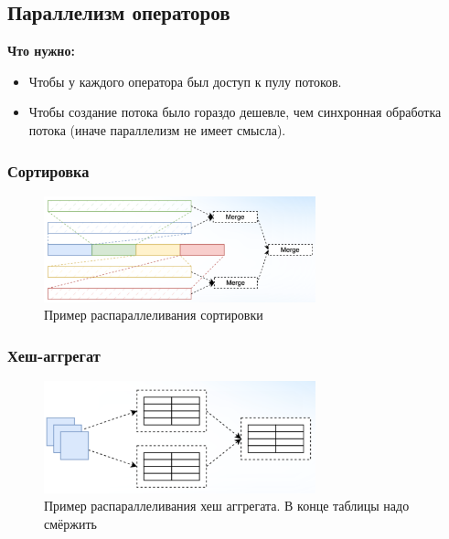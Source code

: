 \documentclass[11pt]{article}
\begin{document}
    \subsection{Параллелизм операторов}

    \textbf{Что нужно:}
    \begin{itemize}
        \item Чтобы у каждого оператора был доступ к пулу потоков.
        \item Чтобы создание потока было гораздо дешевле, чем синхронная обработка потока (иначе параллелизм не имеет смысла).
    \end{itemize}

    \subsubsection{Сортировка}

    \begin{figure}[h!]
        \centering
        \includegraphics[width=0.7\textwidth]{Pictures/Push/Parallelism/Operators/Сортировка}
        \caption{Пример распараллеливания сортировки}
    \end{figure}
    
    \subsubsection{Хеш-аггрегат}
    
    \begin{figure}[h!]
        \centering
        \includegraphics[width=0.7\textwidth]{Pictures/Push/Parallelism/Operators/Хеш аггрегат}
        \caption{Пример распараллеливания хеш аггрегата. В конце таблицы надо смёржить}
    \end{figure}
\end{document}
